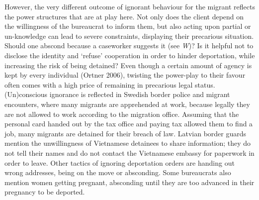 However, the very different outcome of ignorant behaviour for the migrant reflects the power structures that are at play here. Not only does the client depend on the willingness of the bureaucrat to inform them, but also acting upon partial or un-knowledge can lead to severe constraints, displaying their precarious situation. Should one abscond because a caseworker suggests it (see \emph{W})? Is it helpful not to disclose the identity and ‘refuse’ cooperation in order to hinder deportation, while increasing the risk of being detained? Even though a certain amount of agency is kept by every individual (Ortner 2006), twisting the power-play to their favour often comes with a high price of remaining in precarious legal status. (Un)conscious ignorance is reflected in Swedish border police and migrant encounters, where many migrants are apprehended at work, because legally they are not allowed to work according to the migration office. Assuming that the personal card handed out by the tax office and paying tax allowed them to find a job, many migrants are detained for their breach of law. Latvian border guards mention the unwillingness of Vietnamese detainees to share information; they do not tell their names and do not contact the Vietnamese embassy for paperwork in order to leave. Other tactics of ignoring deportation orders are handing out wrong addresses, being on the move or absconding. Some bureaucrats also mention women getting pregnant, absconding until they are too advanced in their pregnancy to be deported.

